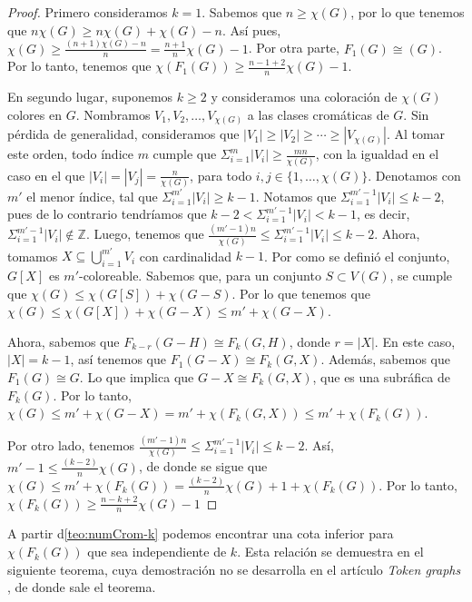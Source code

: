 \begin{proof}
    Primero consideramos $k=1$. Sabemos que $n \geq \chi(G)$, por lo que tenemos
    que $n\chi(G) \geq n\chi(G) + \chi(G) -n$. As\'i pues, $\chi (G) \geq
    \frac{(n+1)\chi(G)-n}{n} = \frac{n+1}{n}\chi (G) -1$. Por otra parte,
    $F_1(G) \cong (G)$. Por lo tanto, tenemos que $\chi(F_1(G)) \geq
    \frac{n-1+2}{n} \chi(G) -1$.
        
    En segundo lugar, suponemos $k \geq 2$ y consideramos una coloraci\'on de
    $\chi(G)$ colores en $G$. Nombramos $V_1, V_2, \dots, V_{\chi(G)}$ a las
    clases crom\'aticas de $G$. Sin p\'erdida de generalidad, consideramos que
    $|V_1|\geq |V_2|\geq \cdots \geq |V_{\chi(G)}|$. Al tomar este orden, todo
    \'indice $m$ cumple que $\Sigma_{i=1}^{m}|V_i| \geq \frac{mn}{\chi(G)}$, con
    la igualdad en el caso en el que $|V_i| = |V_j| = \frac{n}{\chi(G)}$, para
    todo $i,j \in \{1, \dots, \chi(G)\}$. Denotamos con $m'$ el menor \'indice,
    tal que $\Sigma_{i=1}^{m'}|V_i| \geq k-1$. Notamos que
    $\Sigma_{i=1}^{m'-1}|V_i| \leq k-2$, pues de lo contrario tendr\'iamos que
    $k-2<\Sigma_{i=1}^{m'-1}|V_i| < k-1$, es decir, $\Sigma_{i=1}^{m'-1}|V_i|
    \notin \mathbb{Z}$. Luego, tenemos que $\frac{(m'-1)n}{\chi(G)}\leq
    \Sigma_{i=1}^{m'-1}|V_i| \leq k-2$. Ahora, tomamos $X \subseteq
    \bigcup_{i=1}^{m'} V_i$ con cardinalidad $k-1$. Por como se defini\'o el
    conjunto, $G[X]$ es $m'$-coloreable. Sabemos que, para un conjunto $S
    \subset V(G)$, se cumple que $\chi(G) \leq \chi(G[S])+\chi(G-S)$. Por lo que
    tenemos que $\chi(G) \leq \chi(G[X])+\chi(G-X) \leq m' + \chi(G-X)$.

    Ahora, sabemos que $F_{k-r}(G-H) \cong F_k(G,H)$, donde $r = |X|$. En este
    caso, $|X| = k-1$, as\'i tenemos que $F_1(G-X) \cong F_k(G,X)$. Adem\'as,
    sabemos que $F_1(G) \cong G$. Lo que implica que $G-X \cong F_k(G,X)$, que
    es una subr\'afica de $F_k(G)$. Por lo tanto, $\chi(G) \leq m' + \chi(G-X) =
    m' + \chi(F_k(G,X)) \leq m' + \chi(F_k(G))$. 
            
    Por otro lado, tenemos $\frac{(m'-1)n}{\chi(G)}\leq \Sigma_{i=1}^{m'-1}|V_i|
    \leq k-2$. As\'i, $m'-1 \leq \frac{(k-2)}{n}\chi(G)$, de donde se sigue que
    $\chi(G) \leq m' + \chi(F_k(G)) = \frac{(k-2)}{n}\chi(G) +1 + \chi(F_k(G))$.
    Por lo tanto, $\chi(F_k(G)) \geq \frac{n-k+2}{n} \chi(G) -1$
\end{proof}

A partir d\cref{teo:numCrom-k} podemos encontrar una cota inferior para
$\chi(F_k(G))$ que sea independiente de $k$. Esta relaci\'on se demuestra en el
siguiente teorema, cuya demostraci\'on no se desarrolla en el art\'iculo
\textit{Token graphs} \cite{fabilaToken}, de donde sale el teorema.


